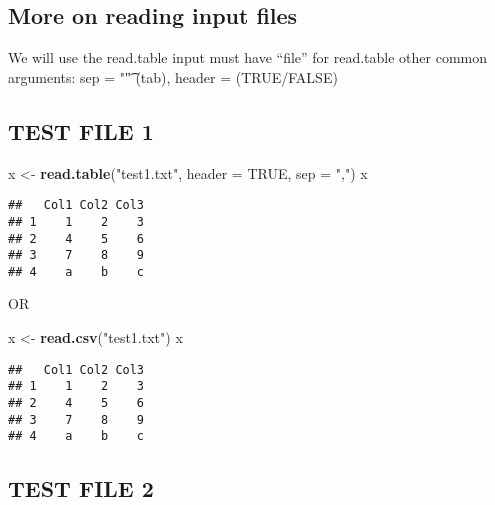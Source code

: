 \documentclass[]{article}
\newenvironment{Shaded}{\begin{snugshade}}{\end{snugshade}}
\newcommand{\DataTypeTok}[1]{\textcolor[rgb]{0.13,0.29,0.53}{#1}}
\newcommand{\KeywordTok}[1]{\textcolor[rgb]{0.13,0.29,0.53}{\textbf{#1}}}
\newcommand{\NormalTok}[1]{#1}
\newcommand{\OtherTok}[1]{\textcolor[rgb]{0.56,0.35,0.01}{#1}}
\newcommand{\StringTok}[1]{\textcolor[rgb]{0.31,0.60,0.02}{#1}}
\begin{document}
\hypertarget{more-on-reading-input-files}{%
\subsection{More on reading input
files}\label{more-on-reading-input-files}}

We will use the read.table input must have ``file'' for read.table other
common arguments: sep = "\t" (tab), header = (TRUE/FALSE)

\hypertarget{test-file-1}{%
\subsection{TEST FILE 1}\label{test-file-1}}

\begin{Shaded}
\begin{Highlighting}[]
\NormalTok{x <-}\StringTok{ }\KeywordTok{read.table}\NormalTok{(}\StringTok{"test1.txt"}\NormalTok{, }\DataTypeTok{header =} \OtherTok{TRUE}\NormalTok{, }\DataTypeTok{sep =} \StringTok{","}\NormalTok{)}
\NormalTok{x}
\end{Highlighting}
\end{Shaded}

\begin{verbatim}
##   Col1 Col2 Col3
## 1    1    2    3
## 2    4    5    6
## 3    7    8    9
## 4    a    b    c
\end{verbatim}

OR

\begin{Shaded}
\begin{Highlighting}[]
\NormalTok{x <-}\StringTok{ }\KeywordTok{read.csv}\NormalTok{(}\StringTok{"test1.txt"}\NormalTok{)}
\NormalTok{x}
\end{Highlighting}
\end{Shaded}

\begin{verbatim}
##   Col1 Col2 Col3
## 1    1    2    3
## 2    4    5    6
## 3    7    8    9
## 4    a    b    c
\end{verbatim}

\hypertarget{test-file-2}{%
\subsection{TEST FILE 2}\label{test-file-2}}

\begin{Shaded}
\end{Shaded}
\end{document}
